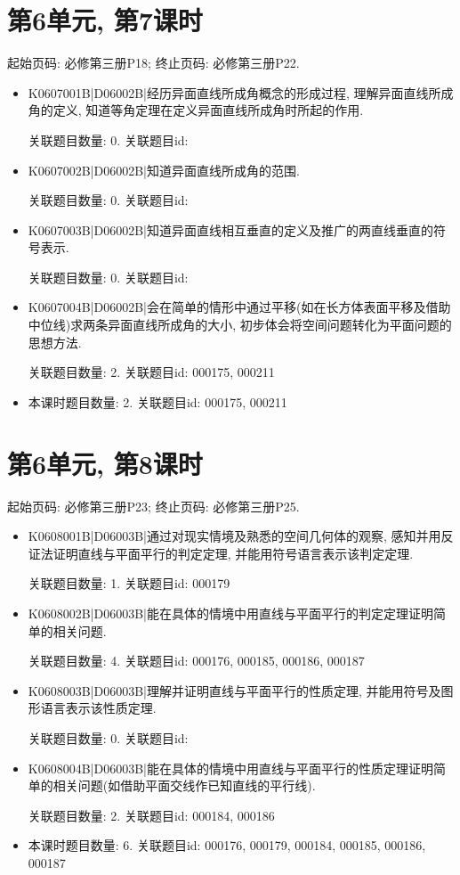 \section*{第6单元, 第7课时}
起始页码: 必修第三册P18; 终止页码: 必修第三册P22.
\begin{itemize}
\item K0607001B|D06002B|经历异面直线所成角概念的形成过程, 理解异面直线所成角的定义, 知道等角定理在定义异面直线所成角时所起的作用.

关联题目数量: 0. 关联题目id: 

\item K0607002B|D06002B|知道异面直线所成角的范围.

关联题目数量: 0. 关联题目id: 

\item K0607003B|D06002B|知道异面直线相互垂直的定义及推广的两直线垂直的符号表示.

关联题目数量: 0. 关联题目id: 

\item K0607004B|D06002B|会在简单的情形中通过平移(如在长方体表面平移及借助中位线)求两条异面直线所成角的大小, 初步体会将空间问题转化为平面问题的思想方法.

关联题目数量: 2. 关联题目id: 000175, 000211

\item 本课时题目数量: 2. 关联题目id: 000175, 000211

\end{itemize}

\section*{第6单元, 第8课时}
起始页码: 必修第三册P23; 终止页码: 必修第三册P25.
\begin{itemize}
\item K0608001B|D06003B|通过对现实情境及熟悉的空间几何体的观察, 感知并用反证法证明直线与平面平行的判定定理, 并能用符号语言表示该判定定理.

关联题目数量: 1. 关联题目id: 000179

\item K0608002B|D06003B|能在具体的情境中用直线与平面平行的判定定理证明简单的相关问题.

关联题目数量: 4. 关联题目id: 000176, 000185, 000186, 000187

\item K0608003B|D06003B|理解并证明直线与平面平行的性质定理, 并能用符号及图形语言表示该性质定理.

关联题目数量: 0. 关联题目id: 

\item K0608004B|D06003B|能在具体的情境中用直线与平面平行的性质定理证明简单的相关问题(如借助平面交线作已知直线的平行线).

关联题目数量: 2. 关联题目id: 000184, 000186

\item 本课时题目数量: 6. 关联题目id: 000176, 000179, 000184, 000185, 000186, 000187

\end{itemize}

